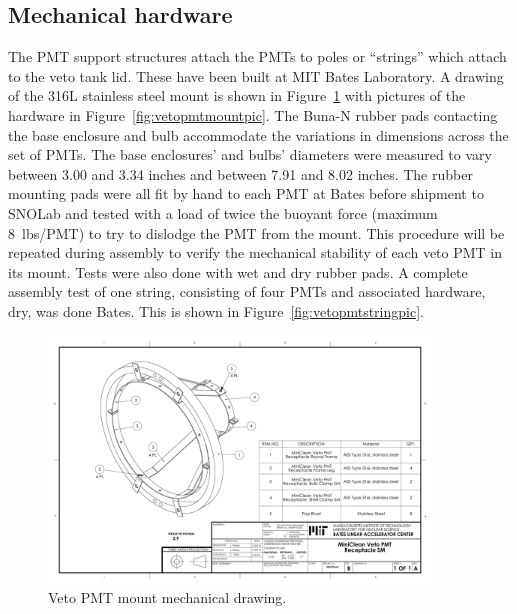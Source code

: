 \documentclass{JINST}
\begin{document}


\subsection{Mechanical hardware}
%
The PMT support structures attach the PMTs to poles or
``strings'' which attach to the veto tank lid.  These have been built at
MIT Bates Laboratory. A drawing of the 316L stainless steel
mount is shown in Figure~\ref{fig:vetopmtmount}
with pictures of the hardware in
Figure~\ref{fig:vetopmtmountpic}. The Buna-N rubber pads contacting
the base enclosure and bulb accommodate the variations in dimensions
across the set of PMTs. The base enclosures' and bulbs' diameters were
measured to vary between 3.00 and 3.34 inches and between 7.91 and
8.02 inches. The rubber mounting pads were all fit by hand to each PMT
at Bates before shipment to SNOLab and tested with a load of twice
the buoyant force (maximum 8~lbs/PMT) to try to dislodge the PMT from
the mount.  This procedure will be repeated during assembly to verify
the mechanical stability of each veto PMT in its mount.  Tests were
also done with wet and dry rubber pads.  A complete assembly test of
one string, consisting of four PMTs and associated hardware, dry, was done
Bates.  This is shown in Figure~\ref{fig:vetopmtstringpic}.

\begin{figure}[ht]
\begin{center}
\includegraphics[width=4in,angle=0]{graphics/vetopmtmount.pdf}
\caption{Veto PMT mount mechanical drawing.
\label{fig:vetopmtmount}}
\end{center}
\end{figure}
\end{document}

